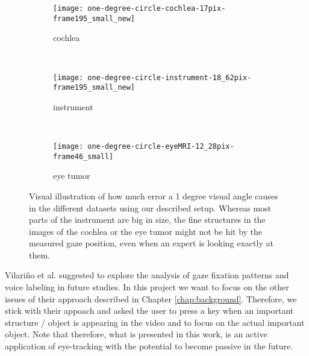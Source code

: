 \begin{figure}[ht]
	\centering
	\begin{subfigure}[h]{0.31\textwidth}
		\texttt{[image: one-degree-circle-cochlea-17pix-frame195\_small\_new]}	
		\caption*{cochlea}
	\end{subfigure}
	~
	\begin{subfigure}[h]{0.31\textwidth}
		\texttt{[image: one-degree-circle-instrument-18\_62pix-frame195\_small\_new]}
		\caption*{instrument}
	\end{subfigure}
	~
	\begin{subfigure}[h]{0.31\textwidth}
		\texttt{[image: one-degree-circle-eyeMRI-12\_28pix-frame46\_small]}	
		\caption*{eye tumor}
	\end{subfigure}
	\caption{Visual illustration of how much error a 1 degree visual angle causes in the different datasets using our described setup. Whereas most parts of the instrument are big in size, the fine structures in the images of the cochlea or the eye tumor might not be hit by the measured gaze position, even when an expert is looking exactly at them.}
	\label{fig:onedegreecircle}
\end{figure}

Vilari\~no et al. suggested to explore the analysis of gaze fixation patterns and voice labeling in future studies. 
In this project we want to focus on the other issues of their approach described in Chapter \ref{chap:background}. 
Therefore, we stick with their appoach and asked the user to press a key when an important structure / object is appearing in the video and to focus on the actual important object. 
Note that therefore, what is presented in this work, is an active application of eye-tracking with the potential to become passive in the future.

